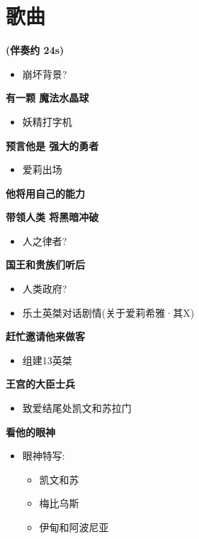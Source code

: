 \documentclass[a4paper]{article}
\begin{document}
\section{歌曲}

\textbf{(伴奏约 24s)}

\begin{itemize}
    \item 崩坏背景?
\end{itemize}

\textbf{有一颗 魔法水晶球}

\begin{itemize}
    \item 妖精打字机
\end{itemize}

\textbf{预言他是 强大的勇者}

\begin{itemize}
    \item 爱莉出场
\end{itemize}

\textbf{他将用自己的能力}

\textbf{带领人类 将黑暗冲破}

\begin{itemize}
    \item 人之律者?
\end{itemize}

\textbf{国王和贵族们听后}

\begin{itemize}
    \item 人类政府?
    \item 乐土英桀对话剧情(关于爱莉希雅·其X)
\end{itemize}

\textbf{赶忙邀请他来做客}

\begin{itemize}
    \item 组建13英桀
\end{itemize}

\textbf{王宫的大臣士兵}

\begin{itemize}
    \item 致爱结尾处凯文和苏拉门
\end{itemize}

\textbf{看他的眼神}

\begin{itemize}
    \item 眼神特写:
    \begin{itemize}
        \item 凯文和苏
        \item 梅比乌斯
        \item 伊甸和阿波尼亚
    \end{itemize}
\end{itemize}
\end{document}
